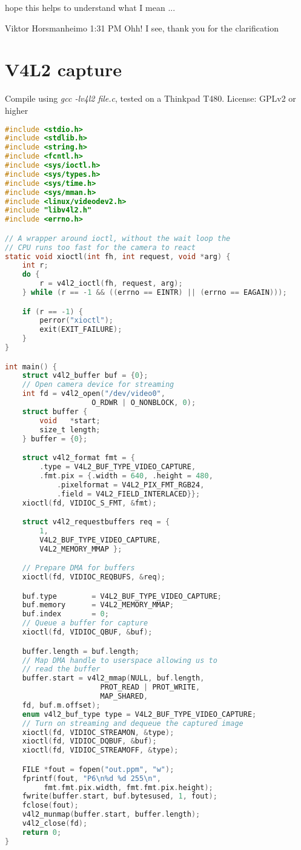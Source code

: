 hope this helps to understand what I mean ...

Viktor Horsmanheimo 1:31 PM
Ohh! I see, thank you for the clarification

\section{V4L2 capture\label{appendix:section:v4l2}}
Compile using \textit{gcc -lv4l2 file.c}, tested on a Thinkpad T480. License:
GPLv2 or higher

\begin{lstlisting}[language=C]
#include <stdio.h>
#include <stdlib.h>
#include <string.h>
#include <fcntl.h>
#include <sys/ioctl.h>
#include <sys/types.h>
#include <sys/time.h>
#include <sys/mman.h>
#include <linux/videodev2.h>
#include "libv4l2.h"
#include <errno.h>

// A wrapper around ioctl, without the wait loop the
// CPU runs too fast for the camera to react
static void xioctl(int fh, int request, void *arg) {
	int r;
	do {
		r = v4l2_ioctl(fh, request, arg);
	} while (r == -1 && ((errno == EINTR) || (errno == EAGAIN)));

	if (r == -1) {
		perror("xioctl");
		exit(EXIT_FAILURE);
	}
}

int main() {
	struct v4l2_buffer buf = {0};
	// Open camera device for streaming
	int fd = v4l2_open("/dev/video0",
					O_RDWR | O_NONBLOCK, 0);
	struct buffer {
		void   *start;
		size_t length;
	} buffer = {0};

	struct v4l2_format fmt = {
		.type = V4L2_BUF_TYPE_VIDEO_CAPTURE,
		.fmt.pix = {.width = 640, .height = 480,
			.pixelformat = V4L2_PIX_FMT_RGB24,
			.field = V4L2_FIELD_INTERLACED}};
	xioctl(fd, VIDIOC_S_FMT, &fmt);

	struct v4l2_requestbuffers req = {
        1,
        V4L2_BUF_TYPE_VIDEO_CAPTURE,
        V4L2_MEMORY_MMAP };

	// Prepare DMA for buffers
	xioctl(fd, VIDIOC_REQBUFS, &req);

	buf.type        = V4L2_BUF_TYPE_VIDEO_CAPTURE;
	buf.memory      = V4L2_MEMORY_MMAP;
	buf.index       = 0;
	// Queue a buffer for capture
	xioctl(fd, VIDIOC_QBUF, &buf);

	buffer.length = buf.length;
	// Map DMA handle to userspace allowing us to
    // read the buffer
	buffer.start = v4l2_mmap(NULL, buf.length,
                      PROT_READ | PROT_WRITE,
                      MAP_SHARED,
	fd, buf.m.offset);
	enum v4l2_buf_type type = V4L2_BUF_TYPE_VIDEO_CAPTURE;
	// Turn on streaming and dequeue the captured image
	xioctl(fd, VIDIOC_STREAMON, &type);
	xioctl(fd, VIDIOC_DQBUF, &buf);
	xioctl(fd, VIDIOC_STREAMOFF, &type);

	FILE *fout = fopen("out.ppm", "w");
	fprintf(fout, "P6\n%d %d 255\n",
		 fmt.fmt.pix.width, fmt.fmt.pix.height);
	fwrite(buffer.start, buf.bytesused, 1, fout);
	fclose(fout);
	v4l2_munmap(buffer.start, buffer.length);
	v4l2_close(fd);
	return 0;
}
\end{lstlisting}
